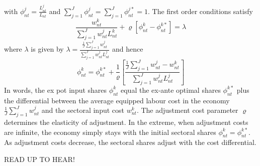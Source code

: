 \documentclass{article}
\begin{document}
with $\phi _{nt}^{j}=\frac{L_{nt}^{j}}{L_{nt}}$ and $\sum_{j=1}^{J}\phi
_{nt}^{j}=\sum_{j=1}^{J}\phi _{nt}^{j\ast }=1.$ The first order conditions
satisfy%
\begin{equation}
\frac{w_{nt}^{k}}{\sum_{j=1}^{J}w_{nt}^{j}L_{nt}^{k}}+\varrho \left[ \phi
_{nt}^{k}-\phi _{nt}^{k\ast }\right] =\lambda 
\end{equation}%
where $\lambda $ is given by $\lambda =\frac{\frac{1}{J}%
\sum_{j=1}^{J}w_{nt}^{j}}{\sum_{j=1}^{J}w_{nt}^{j}L_{nt}^{j}}$ and hence%
\[
\phi _{nt}^{k}=\phi _{nt}^{k\ast }+\frac{1}{\varrho }\left[ \frac{\frac{1}{J}%
\sum_{j=1}^{J}w_{nt}^{j}-w_{nt}^{k}}{\sum_{j=1}^{J}w_{nt}^{j}L_{nt}^{j}}%
\right] 
\]%
In words, the ex pot input shares $\phi _{nt}^{k}$ equal the ex-ante optimal
shares $\phi _{nt}^{k\ast }$ plus the differential between the average
equipped labour cost in the economy $\frac{1}{J}\sum_{j=1}^{J}w_{nt}^{j}$
and the sectoral input cost $w_{nt}^{k}$. The adjustment cost parameter $%
\varrho $ determines the elasticity of adjustment. In the extreme, when
adjustment costs are infinite, the economy simply stays with the initial
sectoral shares $\phi _{nt}^{k}=\phi _{nt}^{k\ast }$. As adjustment costs
decrease, the sectoral shares adjust with the cost differential.

\bigskip 

READ UP TO HEAR!
\end{document}
